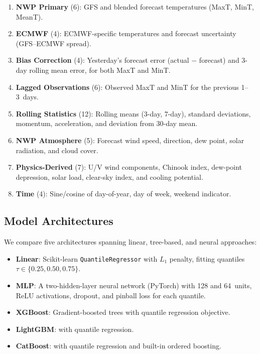 \documentclass[12pt, letterpaper]{article}
\begin{document}
\begin{enumerate}
  \item \textbf{NWP Primary} (6): GFS and blended forecast temperatures
    (MaxT, MinT, MeanT).
  \item \textbf{ECMWF} (4): ECMWF-specific temperatures and forecast uncertainty
    (GFS--ECMWF spread).
  \item \textbf{Bias Correction} (4): Yesterday's forecast error (actual $-$
    forecast) and 3-day rolling mean error, for both MaxT and MinT.
  \item \textbf{Lagged Observations} (6): Observed MaxT and MinT for the previous
    1--3~days.
  \item \textbf{Rolling Statistics} (12): Rolling means (3-day, 7-day), standard
    deviations, momentum, acceleration, and deviation from 30-day mean.
  \item \textbf{NWP Atmosphere} (5): Forecast wind speed, direction, dew point,
    solar radiation, and cloud cover.
  \item \textbf{Physics-Derived} (7): U/V wind components, Chinook index,
    dew-point depression, solar load, clear-sky index, and cooling potential.
  \item \textbf{Time} (4): Sine/cosine of day-of-year, day of week, weekend
    indicator.
\end{enumerate}

\subsection{Model Architectures}
\label{sec:models}

We compare five architectures spanning linear, tree-based, and neural approaches:

\begin{itemize}
  \item \textbf{Linear}: Scikit-learn \texttt{QuantileRegressor} with $L_1$
    penalty, fitting quantiles $\tau \in \{0.25, 0.50, 0.75\}$.
  \item \textbf{MLP}: A two-hidden-layer neural network (PyTorch) with 128 and
    64~units, ReLU activations, dropout, and pinball loss for each quantile.
  \item \textbf{XGBoost}: Gradient-boosted trees \citep{chen2016xgboost} with
    quantile regression objective.
  \item \textbf{LightGBM}: \citet{ke2017lightgbm} with quantile regression.
  \item \textbf{CatBoost}: \citet{prokhorenkova2018catboost} with quantile
    regression and built-in ordered boosting.
\end{itemize}
\end{document}
